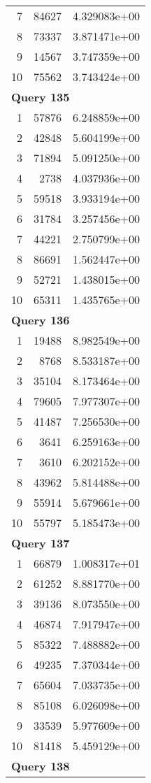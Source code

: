 \begin{longtable}[{p}]{@{}rrp{}@{}}
7 & 84627 & 4.329083e+00 \\
8 & 73337 & 3.871471e+00 \\
9 & 14567 & 3.747359e+00 \\
10 & 75562 & 3.743424e+00 \\
\midrule
\multicolumn{3}{l}{\bfseries Query 135} \\
1 & 57876 & 6.248859e+00 \\
2 & 42848 & 5.604199e+00 \\
3 & 71894 & 5.091250e+00 \\
4 & 2738 & 4.037936e+00 \\
5 & 59518 & 3.933194e+00 \\
6 & 31784 & 3.257456e+00 \\
7 & 44221 & 2.750799e+00 \\
8 & 86691 & 1.562447e+00 \\
9 & 52721 & 1.438015e+00 \\
10 & 65311 & 1.435765e+00 \\
\midrule
\multicolumn{3}{l}{\bfseries Query 136} \\
1 & 19488 & 8.982549e+00 \\
2 & 8768 & 8.533187e+00 \\
3 & 35104 & 8.173464e+00 \\
4 & 79605 & 7.977307e+00 \\
5 & 41487 & 7.256530e+00 \\
6 & 3641 & 6.259163e+00 \\
7 & 3610 & 6.202152e+00 \\
8 & 43962 & 5.814488e+00 \\
9 & 55914 & 5.679661e+00 \\
10 & 55797 & 5.185473e+00 \\
\midrule
\multicolumn{3}{l}{\bfseries Query 137} \\
1 & 66879 & 1.008317e+01 \\
2 & 61252 & 8.881770e+00 \\
3 & 39136 & 8.073550e+00 \\
4 & 46874 & 7.917947e+00 \\
5 & 85322 & 7.488882e+00 \\
6 & 49235 & 7.370344e+00 \\
7 & 65604 & 7.033735e+00 \\
8 & 85108 & 6.026098e+00 \\
9 & 33539 & 5.977609e+00 \\
10 & 81418 & 5.459129e+00 \\
\midrule
\multicolumn{3}{l}{\bfseries Query 138} \\

\end{longtable}
